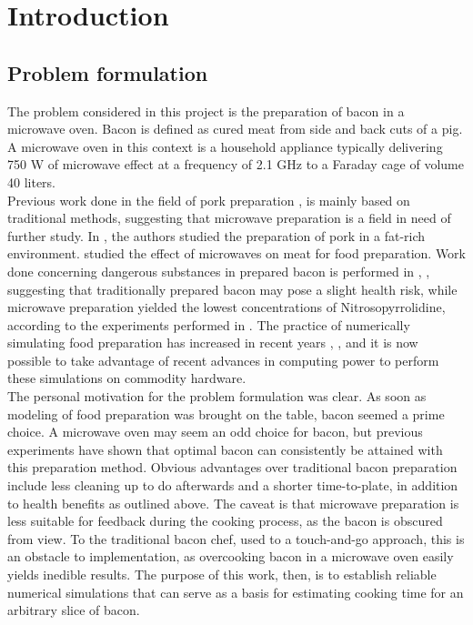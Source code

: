 \chapter{Introduction}
\setcounter{secnumdepth}{1}

\section{Problem formulation}
The problem considered in this project is the preparation of bacon in a microwave oven. Bacon is
defined as cured meat from side and back cuts of a pig. A microwave oven in this context is a
household appliance typically delivering 750 W of microwave effect at a frequency of 2.1 GHz
to a Faraday cage of volume 40 liters.\\ 

Previous work done in the field of pork preparation
\cite{pork-cooking-diffusion}, \cite{pork-chops} is mainly based on
traditional methods, suggesting that microwave preparation is
a field in need of further study. In \cite{deepfrying}, the authors studied the preparation of
pork in a fat-rich environment. \cite{nykvist} studied the effect of microwaves on meat for
food preparation. Work done concerning dangerous substances in
prepared bacon is performed in \cite{bacon-safety-original}, \cite{bacon-safety-micro}, suggesting that traditionally prepared
bacon may pose a slight health risk, while microwave preparation yielded the
lowest concentrations of Nitrosopyrrolidine, according to the experiments
performed in \cite{bacon-safety-micro}.
The practice of numerically simulating food preparation has increased in recent
years \cite{meat-cooking-numerical}, \cite{chicken-numerics}, and it is now
possible to take advantage of recent advances in computing power to perform these 
simulations on commodity hardware.\\

The personal motivation for the problem formulation was clear. As soon as modeling of food preparation was
brought on the table, bacon seemed a prime choice. A microwave oven may seem an odd choice for
bacon, but previous experiments have shown that optimal bacon can consistently be attained with this
preparation method. Obvious advantages over traditional bacon preparation include less cleaning up
to do afterwards and a shorter time-to-plate, in addition to health benefits as
outlined above. The caveat is that microwave preparation is less
suitable for feedback during the cooking process, as the bacon is obscured from view. To the
traditional bacon chef, used to a touch-and-go approach, this is an obstacle to implementation, as
overcooking bacon in a microwave oven easily yields inedible results. The
purpose of this work, then, is to establish reliable numerical simulations that can serve as a basis
for estimating cooking time for an arbitrary slice of bacon.\\

